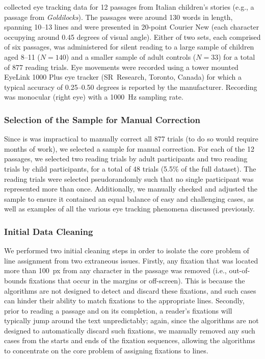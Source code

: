 \documentclass[doc,biblatex]{apa7}
\begin{document}
\textcite{Pescuma:0000} collected eye tracking data for 12 passages from Italian children's stories (e.g., a passage from \textit{Goldilocks}). The passages were around 130 words in length, spanning 10--13 lines and were presented in 20-point Courier New (each character occupying around 0.45 degrees of visual angle). Either of two sets, each comprised of six passages, was administered for silent reading to a large sample of children aged 8--11 ($N=140$) and a smaller sample of adult controls ($N=33$) for a total of 877 reading trials. Eye movements were recorded using a tower mounted EyeLink 1000 Plus eye tracker (SR~Research, Toronto, Canada) for which a typical accuracy of 0.25--0.50 degrees is reported by the manufacturer. Recording was monocular (right eye) with a 1000~Hz sampling rate.

\subsubsection{Selection of the Sample for Manual Correction}

Since is was impractical to manually correct all 877 trials (to do so would require months of work), we selected a sample for manual correction. For each of the 12 passages, we selected two reading trials by adult participants and two reading trials by child participants, for a total of 48 trials (5.5\% of the full dataset). The reading trials were selected pseudorandomly such that no single participant was represented more than once. Additionally, we manually checked and adjusted the sample to ensure it contained an equal balance of easy and challenging cases, as well as examples of all the various eye tracking phenomena discussed previously.

\subsubsection{Initial Data Cleaning}

We performed two initial cleaning steps in order to isolate the core problem of line assignment from two extraneous issues. Firstly, any fixation that was located more than 100~px from any character in the passage was removed (i.e., out-of-bounds fixations that occur in the margins or off-screen). This is because the algorithms are not designed to detect and discard these fixations, and such cases can hinder their ability to match fixations to the appropriate lines. Secondly, prior to reading a passage and on its completion, a reader's fixations will typically jump around the text unpredictably; again, since the algorithms are not designed to automatically discard such fixations, we manually removed any such cases from the starts and ends of the fixation sequences, allowing the algorithms to concentrate on the core problem of assigning fixations to lines.
\end{document}
